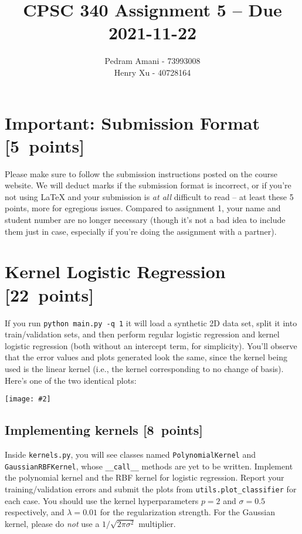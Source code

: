 \documentclass{article}
\newcommand{\blu}[1]{{\textcolor{blu}{#1}}}
\let\ask\blu
\newenvironment{asking}{\begingroup\color{blu}}{\endgroup}
\newcommand\pts[1]{\textcolor{pointscolour}{[#1~points]}}
\newcommand{\centerfig}[2]{\begin{center}\texttt{[image: \#2]}\end{center}}
\begin{document}
\title{CPSC 340 Assignment 5 -- Due 2021-11-22}
\date{}
\author{
        Pedram Amani - 73993008\\
        Henry Xu - 40728164
    }
\maketitle



\section*{Important: Submission Format \pts{5}}

Please make sure to follow the submission instructions posted on the course website.
\ask{We will deduct marks if the submission format is incorrect, or if you're not using \LaTeX{} and your submission is \emph{at all} difficult to read} -- at least these 5 points, more for egregious issues.
Compared to assignment 1, your name and student number are no longer necessary (though it's not a bad idea to include them just in case, especially if you're doing the assignment with a partner).

\vspace{1em}



\section{Kernel Logistic Regression \pts{22}}

If you run \verb|python main.py -q 1| it will load a synthetic 2D data set, split it into train/validation sets, and then perform regular logistic regression and kernel logistic regression (both without an intercept term, for simplicity). You'll observe that the error values and plots generated look the same, since the kernel being used is the linear kernel (i.e., the kernel corresponding to no change of basis). Here's one of the two identical plots:
\centerfig{0.5}{figs/logReg.png}


\subsection{Implementing kernels \pts{8}}

Inside \texttt{kernels.py}, you will see classes named \texttt{PolynomialKernel} and \texttt{GaussianRBFKernel}, whose \verb|__call__| methods are yet to be written.
\begin{asking}
  Implement the polynomial kernel and the RBF kernel for logistic regression.
  Report your training/validation errors and submit the plots from \verb|utils.plot_classifier| for each case.
\end{asking}
You should use the kernel hyperparameters $p=2$ and $\sigma=0.5$ respectively,
and $\lambda=0.01$ for the regularization strength.
For the Gaussian kernel, please do \emph{not} use a $1/\sqrt{2\pi\sigma^2}$ multiplier.
\end{document}
